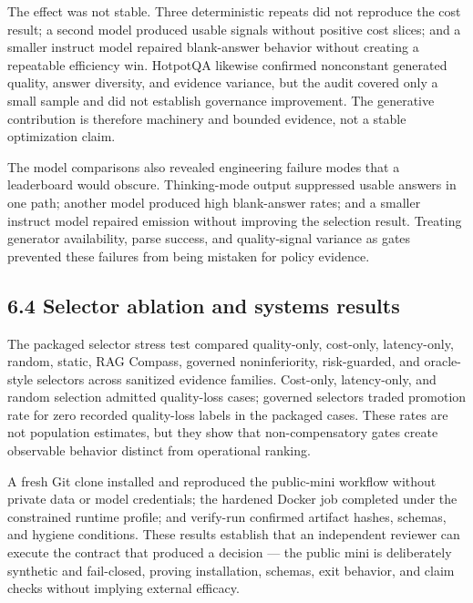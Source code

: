 \documentclass[11pt]{article}
\begin{document}
The effect was not stable. Three deterministic repeats did not reproduce the cost result; a second model produced usable signals without positive cost slices; and a smaller instruct model repaired blank-answer behavior without creating a repeatable efficiency win. HotpotQA likewise confirmed nonconstant generated quality, answer diversity, and evidence variance, but the audit covered only a small sample and did not establish governance improvement. The generative contribution is therefore machinery and bounded evidence, not a stable optimization claim.

The model comparisons also revealed engineering failure modes that a leaderboard would obscure. Thinking-mode output suppressed usable answers in one path; another model produced high blank-answer rates; and a smaller instruct model repaired emission without improving the selection result. Treating generator availability, parse success, and quality-signal variance as gates prevented these failures from being mistaken for policy evidence.

\subsection{6.4 Selector ablation and systems results}
The packaged selector stress test compared quality-only, cost-only, latency-only, random, static, RAG Compass, governed noninferiority, risk-guarded, and oracle-style selectors across sanitized evidence families. Cost-only, latency-only, and random selection admitted quality-loss cases; governed selectors traded promotion rate for zero recorded quality-loss labels in the packaged cases. These rates are not population estimates, but they show that non-compensatory gates create observable behavior distinct from operational ranking.

A fresh Git clone installed and reproduced the public-mini workflow without private data or model credentials; the hardened Docker job completed under the constrained runtime profile; and verify-run confirmed artifact hashes, schemas, and hygiene conditions. These results establish that an independent reviewer can execute the contract that produced a decision --- the public mini is deliberately synthetic and fail-closed, proving installation, schemas, exit behavior, and claim checks without implying external efficacy.
\end{document}
